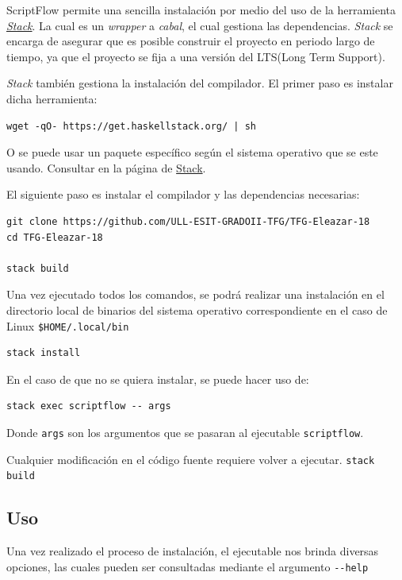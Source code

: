 \documentclass[11pt]{article}
\begin{document}
ScriptFlow permite una sencilla instalación por medio del uso de la herramienta \emph{\href{https://docs.haskellstack.org/en/stable/README/}{Stack}}. La cual es un \emph{wrapper} a \emph{cabal}, el cual gestiona
las dependencias. \emph{Stack} se encarga de asegurar que es posible construir
el proyecto en periodo largo de tiempo, ya que el proyecto se fija a una
versión del LTS(Long Term Support).

\emph{Stack} también gestiona la instalación del compilador. El primer paso es instalar dicha herramienta:
\begin{verbatim}
wget -qO- https://get.haskellstack.org/ | sh
\end{verbatim}
O se puede usar un paquete específico según el sistema operativo que se este usando. Consultar en la página de \href{https://docs.haskellstack.org/en/stable/install\_and\_upgrade/}{Stack}.

El siguiente paso es instalar el compilador y las dependencias necesarias:

\begin{verbatim}
git clone https://github.com/ULL-ESIT-GRADOII-TFG/TFG-Eleazar-18
cd TFG-Eleazar-18

stack build
\end{verbatim}

Una vez ejecutado todos los comandos, se podrá realizar una instalación en el directorio local de binarios del sistema operativo correspondiente
en el caso de Linux \texttt{\$HOME/.local/bin}

\begin{verbatim}
stack install
\end{verbatim}

En el caso de que no se quiera instalar, se puede hacer uso de:
\begin{verbatim}
stack exec scriptflow -- args
\end{verbatim}

Donde \texttt{args} son los argumentos que se pasaran al ejecutable \texttt{scriptflow}.

Cualquier modificación en el código fuente requiere volver a ejecutar. \texttt{stack build}

\subsection{Uso}
\label{sec:orgb21a0aa}

Una vez realizado el proceso de instalación, el ejecutable nos brinda diversas opciones, las cuales pueden
ser consultadas mediante el argumento \texttt{-{}-help}
\end{document}
